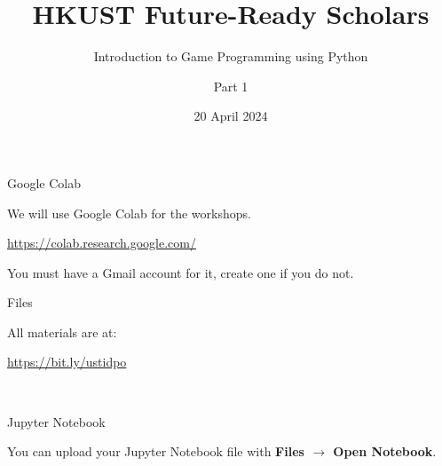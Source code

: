 \documentclass[dvipsnames, svgnames, x11names]{beamer}
\title[HKUST Future-Ready Scholars]{HKUST Future-Ready Scholars}
\subtitle{Introduction to Game Programming using Python}
\author[Game Programming using Python]{Part 1}
\date[April 2024]{20 April 2024}
\begin{document}
\frame{\titlepage}

\begin{frame}[fragile]{Google Colab}
    \begin{center}
        We will use Google Colab for the workshops.

        \href{https://colab.research.google.com/}{https://colab.research.google.com/}

        You must have a Gmail account for it, create one if you do not.
    \end{center}
\end{frame}

\begin{frame}[fragile]{Files}
    \begin{center}
        All materials are at:

        \href{https://bit.ly/ustidpo}{https://bit.ly/ustidpo}

        \

    \end{center}
\end{frame}

\begin{frame}[fragile]{Jupyter Notebook}
    \begin{center}
        You can upload your Jupyter Notebook file with \textbf{Files $\rightarrow$ Open Notebook}.
    
        \

    
    \end{center}
\end{frame}
\end{document}
